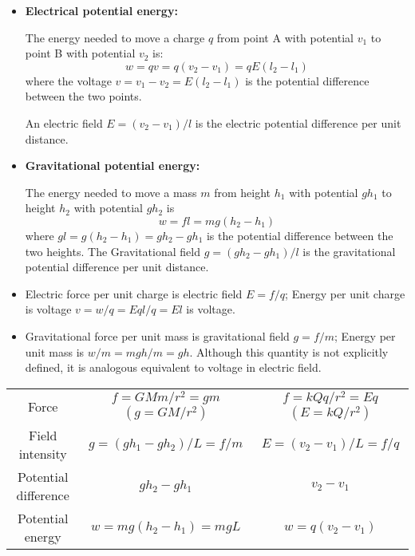 \documentclass{article}
\begin{document}
\begin{itemize}
  \begin{itemize}
  \item {\bf Electrical potential energy:}
    
    The energy needed to move a charge $q$ from point A with  potential 
    $v_1$ to point B with potential $v_2$ is:
    \begin{equation}
      w=qv=q(v_2-v_1)=qE(l_2-l_1)
    \end{equation}
    where the voltage $v=v_1-v_2=E(l_2-l_1)$ is the potential difference
    between the two points.
  
    An electric field $E=(v_2-v_1)/l$ is the electric potential difference
    per unit distance.

  \item {\bf Gravitational potential energy:}

    The energy needed to move a mass $m$ from height $h_1$ with 
    potential $gh_1$ to height $h_2$ with potential $gh_2$ is 
    \begin{equation} 
      w=fl=mg(h_2-h_1)
    \end{equation}
    where $gl=g(h_2-h_1)=gh_2-gh_1$ is the potential difference between the 
    two heights.
    The Gravitational field $g=(gh_2-gh_1)/l$ is the gravitational potential
    difference per unit distance.

  \end{itemize}


  \begin{itemize}
  \item Electric force per unit charge is electric field $E=f/q$;
    Energy per unit charge is voltage $v=w/q=Eql/q=El$ is voltage.
  \item Gravitational force per unit mass is gravitational field $g=f/m$;
    Energy per unit mass is $w/m=mgh/m=gh$. Although this quantity is not
    explicitly defined, it is analogous equivalent to voltage in electric
    field.
  \end{itemize}

  \begin{tabular}{c||c|c}\hline
    Force & $f=GMm/r^2=gm$ $(g=GM/r^2)$ & $f=kQq/r^2=Eq$ $(E=kQ/r^2)$ \\
    Field intensity & $g=(gh_1-gh_2)/L=f/m$ & $E=(v_2-v_1)/L=f/q$ \\
    Potential difference & $gh_2-gh_1$ & $v_2-v_1$ \\
    Potential energy & $w=mg(h_2-h_1)=mgL$ & $w=q(v_2-v_1)$ \\
  \end{tabular}


\end{itemize}
\end{document}
